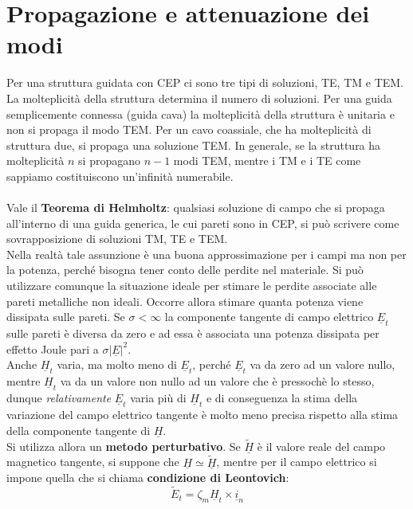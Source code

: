 \documentclass{book}
\begin{document}
\section{Propagazione e attenuazione dei modi}
    Per una struttura guidata con CEP ci sono tre tipi di soluzioni, TE, TM e TEM. La molteplicità della struttura determina il numero di soluzioni.
    Per una guida semplicemente connessa (guida cava) la molteplicità della struttura è unitaria e non si propaga il modo TEM. Per un cavo coassiale,
    che ha molteplicità di struttura due, si propaga una soluzione TEM. In generale, se la struttura ha molteplicità $n$ si propagano $n-1$ modi TEM, mentre 
    i TM e i TE come sappiamo costituiscono un'infinità numerabile. \\ \\
    Vale il \textbf{Teorema di Helmholtz}: qualsiasi soluzione di campo che si propaga all'interno di una guida generica, le cui pareti sono in CEP, si può scrivere
    come sovrapposizione di soluzioni TM, TE e TEM. \\
    Nella realtà tale assunzione è una buona approssimazione per i campi ma non per la potenza, perché bisogna tener conto delle perdite 
    nel materiale. Si può utilizzare comunque la situazione ideale per stimare le perdite associate alle pareti metalliche non ideali. Occorre allora 
    stimare quanta potenza viene dissipata sulle pareti. Se $\sigma < \infty$ la componente tangente di campo elettrico $\underline{E}_{t}$ sulle pareti
    è diversa da zero e ad essa è associata una potenza dissipata per effetto Joule pari a $\sigma |\underline{E}|^{2}$. \\
    Anche $\underline{H}_{t}$ varia, ma molto meno di $\underline{E}_{t}$, perché $\underline{E}_{t}$ va da zero ad un valore nullo, mentre $\underline{H}_{t}$ va da un valore 
    non nullo ad un valore che è pressochè lo stesso, dunque \textit{relativamente} $\underline{E}_{t}$ varia più di $\underline{H}_{t}$ e di conseguenza la stima della variazione del campo elettrico 
    tangente è molto meno precisa rispetto alla stima della componente tangente di $\underline{H}$.  \\ 
    Si utilizza allora un \textbf{metodo perturbativo}. Se $\tilde{\underline{H}}$ è il valore reale del campo magnetico tangente, si suppone 
    che $\underline{H} \simeq \tilde{\underline{H}}$, mentre per il campo elettrico si impone quella che si chiama \textbf{condizione di Leontovich}:
    \begin{equation}
        \tilde{E}_{t} = \zeta_{m}\underline{H}_{t} \times \underline{i}_{n}
    \end{equation}
\end{document}
